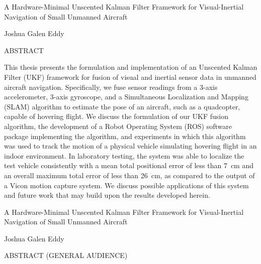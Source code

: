 \begin{center}
{\large 
A Hardware-Minimal Unscented Kalman Filter Framework for Visual-Inertial Navigation of Small Unmanned Aircraft
}

\vspace{2em}

Joshua Galen Eddy

\vspace{2em}

ABSTRACT

\vspace{1em}

\end{center}

This thesis presents the formulation and implementation of an Unscented Kalman Filter (UKF) framework for fusion of visual and inertial sensor data in unmanned aircraft navigation. Specifically, we fuse sensor readings from a 3-axis accelerometer, 3-axis gyroscope, and a Simultaneous Localization and Mapping (SLAM) algorithm to estimate the pose of an aircraft, such as a quadcopter, capable of hovering flight. We discuss the formulation of our UKF fusion algorithm, the development of a Robot Operating System (ROS) software package implementing the algorithm, and experiments in which this algorithm was used to track the motion of a physical vehicle simulating hovering flight in an indoor environment. In laboratory testing, the system was able to localize the test vehicle consistently with a mean total positional error of less than 7~cm and an overall maximum total error of less than 26~cm, as compared to the output of a Vicon motion capture system. We discuss possible applications of this system and future work that may build upon the results developed herein.

\thispagestyle{empty}

\pagebreak

\begin{center}
{\large 
A Hardware-Minimal Unscented Kalman Filter Framework for Visual-Inertial Navigation of Small Unmanned Aircraft
}

\vspace{2em}

Joshua Galen Eddy

\vspace{2em}

ABSTRACT (GENERAL AUDIENCE)

\vspace{1em}

\end{center}

